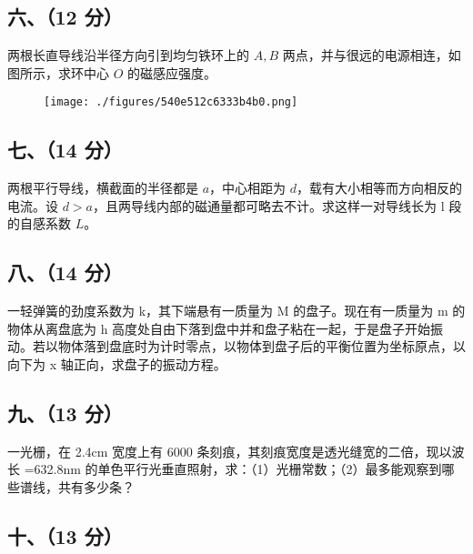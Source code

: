 \subsection{六、（12 分）}
两根长直导线沿半径方向引到均匀铁环上的 $A,B$ 两点，并与很远的电源相连，如图所示，求环中心 $O$ 的磁感应强度。
\begin{figure}[ht]
\centering
\texttt{[image: ./figures/540e512c6333b4b0.png]}
\caption{} \label{fig_NJUD3_6}
\end{figure}
\subsection{七、（14 分）}
两根平行导线，横截面的半径都是 $a$，中心相距为 $d$，载有大小相等而方向相反的电流。设 $d>a$，且两导线内部的磁通量都可略去不计。求这样一对导线长为 l 段的自感系数 $L$。
\subsection{八、（14 分）}
一轻弹簧的劲度系数为 k，其下端悬有一质量为 M 的盘子。现在有一质量为 m 的物体从离盘底为 h 高度处自由下落到盘中并和盘子粘在一起，于是盘子开始振动。若以物体落到盘底时为计时零点，以物体到盘子后的平衡位置为坐标原点，以向下为 x 轴正向，求盘子的振动方程。
\subsection{九、（13 分）}
一光栅，在 2.4cm 宽度上有 6000 条刻痕，其刻痕宽度是透光缝宽的二倍，现以波长 =632.8nm 的单色平行光垂直照射，求：（1）光栅常数；（2）最多能观察到哪些谱线，共有多少条？
\subsection{十、（13 分）}